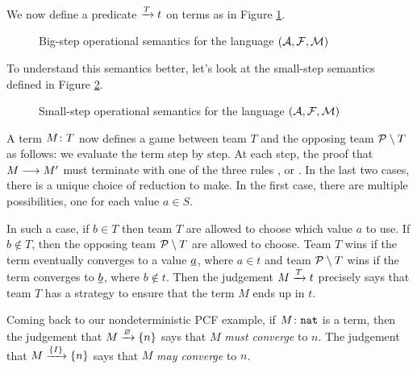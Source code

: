 \documentclass{article}
\begin{document}
We now define a predicate $\Tct$ on terms as in Figure \ref{fig:big-step}.  
\begin{figure}
  \caption{Big-step operational semantics for the language $(\A,\F,\M)$}
  \label{fig:big-step}
\end{figure}
To understand this semantics better, let's look at the small-step semantics defined in Figure \ref{fig:small-step}.
\begin{figure}
  \caption{Small-step operational semantics for the language $(\A,\F,\M)$}
  \label{fig:small-step}
\end{figure}
A term $M\from T$ now defines a game between team $T$ and the opposing team $\P\setminus T$ as follows: we evaluate the term step by step.  At each step, the proof that $M\opto M'$ must terminate with one of the three rules ,  or .  In the last two cases, there is a unique choice of reduction to make.  In the first case, there are multiple possibilities, one for each value $a\in S$.  

In such a case, if $b\in T$ then team $T$ are allowed to choose which value $a$ to use.  If $b\not\in T$, then the opposing team $\P\setminus T$ are allowed to choose.  Team $T$ wins if the term eventually converges to a value $\ul{a}$, where $a\in t$ and team $\P\setminus T$ wins if the term converges to $\ul{b}$, where $b\not\in t$.  Then the judgement $M\Tct$ precisely says that team $T$ has a strategy to ensure that the term $M$ ends up in $t$.  

\begin{example}
  Coming back to our nondeterministic PCF example, if $M\from\nat$ is a term, then the judgement that $M\teamconverge{\emptyset}{\{n\}}$ says that $M$ \emph{must converge} to $n$.  The judgement that $M\teamconverge{\{I\}}{\{n\}}$ says that $M$ \emph{may converge} to $n$.
\end{example}
\end{document}
